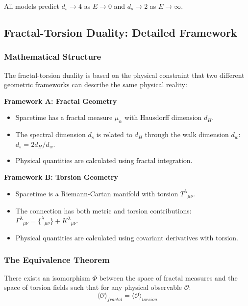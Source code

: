 \documentclass[12pt,a4paper]{article}
\begin{document}
All models predict $d_s \to 4$ as $E \to 0$ and $d_s \to 2$ as $E \to \infty$.

\subsection{Fractal-Torsion Duality: Detailed Framework}

\subsubsection{Mathematical Structure}

The fractal-torsion duality is based on the physical constraint that two different geometric frameworks can describe the same physical reality:

\textbf{Framework A: Fractal Geometry}
\begin{itemize}
    \item Spacetime has a fractal measure $\mu_\alpha$ with Hausdorff dimension $d_H$.
    \item The spectral dimension $d_s$ is related to $d_H$ through the walk dimension $d_w$: $d_s = 2d_H/d_w$.
    \item Physical quantities are calculated using fractal integration.
\end{itemize}

\textbf{Framework B: Torsion Geometry}
\begin{itemize}
    \item Spacetime is a Riemann-Cartan manifold with torsion $T^\lambda{}_{\mu\nu}$.
    \item The connection has both metric and torsion contributions: $\Gamma^\lambda{}_{\mu\nu} = \{^\lambda{}_{\mu\nu}\} + K^\lambda{}_{\mu\nu}$.
    \item Physical quantities are calculated using covariant derivatives with torsion.
\end{itemize}

\subsubsection{The Equivalence Theorem}

\begin{theorem}
There exists an isomorphism $\Phi$ between the space of fractal measures and the space of torsion fields such that for any physical observable $\mathcal{O}$:
\begin{equation}
    \langle\mathcal{O}\rangle_{fractal} = \langle\mathcal{O}\rangle_{torsion}
\end{equation}
\end{theorem}
\end{document}
